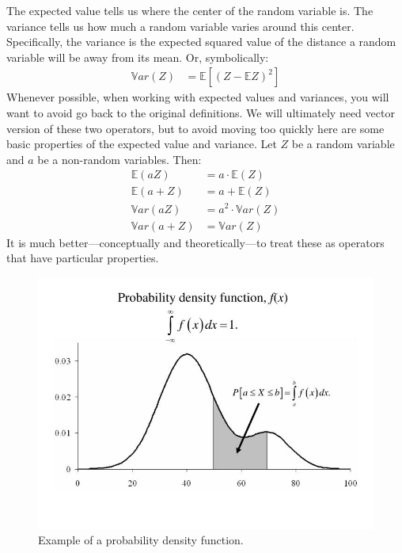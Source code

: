 \documentclass[12pt,hidelinks]{article}
\numberwithin{equation}{section}
\begin{document}
The expected value tells us where the center of the random variable is. The
variance tells us how much a random variable varies around this center.
Specifically, the variance is the expected squared value of the distance a
random variable will be away from its mean. Or, symbolically:
\begin{align}
\mathbb{V}ar(Z) &= \mathbb{E} \left[ \left(Z - \mathbb{E} Z \right)^2 \right]
\end{align}
Whenever possible, when working with expected values and variances, you will
want to avoid go back to the original definitions.  We will ultimately need
vector version of these two operators, but to avoid moving too quickly here
are some basic properties of the expected value and variance. Let $Z$ be a random
variable and $a$ be a non-random variables. Then:
\begin{align}
\mathbb{E}(aZ) &= a \cdot \mathbb{E}(Z) \\
\mathbb{E}(a + Z) &= a + \mathbb{E}(Z) \\
\mathbb{V}ar(aZ) &= a^2 \cdot \mathbb{V}ar(Z) \\
\mathbb{V}ar(a + Z) &= \mathbb{V}ar(Z)
\end{align}
It is much better---conceptually and theoretically---to treat these as
operators that have particular properties.

\begin{figure}
\begin{center}
\includegraphics[width=\textwidth]{figures/pdensfun.jpg}
\end{center}
\caption{Example of a probability density function.}
\end{figure}
\end{document}
